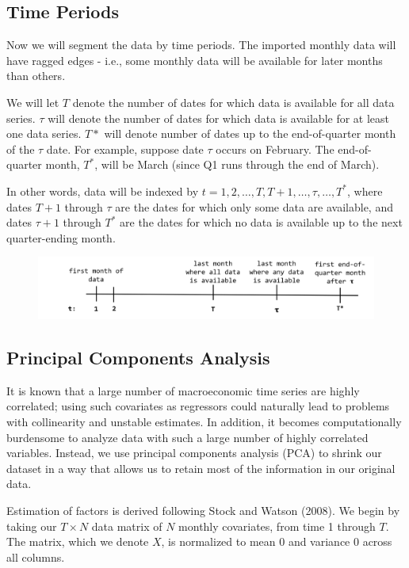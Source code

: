 \documentclass[11pt, letterpaper]{article}\usepackage[]{graphicx}\usepackage[]{color}
\begin{document}
\subsection{Time Periods}
Now we will segment the data by time periods. The imported monthly data will have ragged edges - i.e., some monthly data will be available for later months than others.

We will let $T$ denote the number of dates for which data is available for all data series. $\tau$ will denote the number of dates for which data is available for at least one data series. $T*$ will denote number of dates up to the end-of-quarter month of the $\tau$ date. For example, suppose date $\tau$ occurs on February. The end-of-quarter month, $T^*$, will be March (since Q1 runs through the end of March). 

In other words, data will be indexed by $t = 1, 2, \dots, T, T+1, \dots, \tau, \dots, T^*$, where dates $T + 1$ through $\tau$ are the dates for which only some data are available, and dates $\tau + 1$ through $T^*$ are the dates for which no data is available up to the next quarter-ending month.
\begin{figure}[H]
\includegraphics[scale=.7]{nowcast-time}
\centering
\end{figure}



\subsection{Principal Components Analysis}
It is known that a large number of macroeconomic time series are highly correlated; using such covariates as regressors could naturally lead to problems with collinearity and unstable estimates. In addition, it becomes computationally burdensome to analyze data with such a large number of highly correlated variables. Instead, we use principal components analysis (PCA) to shrink our dataset in a way that allows us to retain most of the information in our original data.

Estimation of factors is derived following Stock and Watson (2008). We begin by taking our $T \times N$ data matrix of $N$ monthly covariates, from time 1 through $T$. The matrix, which we denote $X$, is normalized to mean 0 and variance 0 across all columns.
\end{document}
